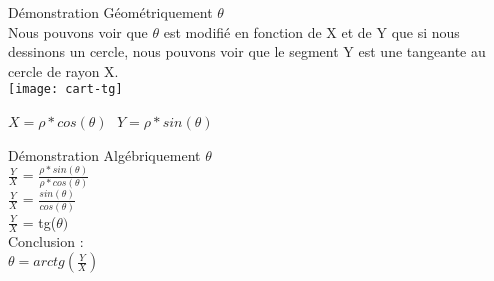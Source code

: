 Démonstration Géométriquement $\theta$ \\

Nous pouvons voir que $\theta$ est modifié en fonction de X et de Y que si nous dessinons un cercle, nous pouvons voir que le segment Y est une tangeante au cercle de rayon X. \\

\texttt{[image: cart-tg]}

$X=\rho * cos(\theta)$ $ $ $ Y=\rho * sin(\theta)$

\vspace{5mm} %
Démonstration Algébriquement $\theta$ \\

$\frac{Y}{X}$ = $\frac{\rho * sin(\theta)}{\rho * cos(\theta)}$ \\
$\frac{Y}{X}$ = $\frac{sin(\theta)}{cos(\theta)}$ \\
$\frac{Y}{X}$ = tg($\theta)$ \\

\vspace{5mm} %
Conclusion : \\

$\theta = arctg(\frac{Y}{X})$
